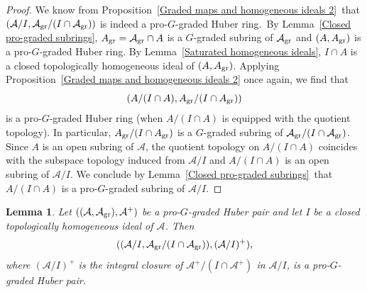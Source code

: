 \documentclass[12pt,twoside,a4paper]{article}
\newtheorem{lemma}[thm]{Lemma}
\theoremstyle{definition}
\theoremstyle{remark}
\newcommand\gr{{\rm gr}}
\begin{document}
\begin{proof}We know from Proposition~\ref{Graded maps and homogeneous ideals 2} that $(\mathcal{A}/I, \mathcal{A}_{\gr}/(I\cap \mathcal{A}_{\gr}))$ is indeed a pro-$G$-graded Huber ring. By Lemma~\ref{Closed pro-graded subrings}, $A_{\gr}=\mathcal{A}_{\gr}\cap A$ is a $G$-graded subring of $\mathcal{A}_{\gr}$ and $(A, A_{\gr})$ is a pro-$G$-graded Huber ring. By Lemma~\ref{Saturated homogeneous ideals}, $I\cap A$ is a closed topologically homogeneous ideal of $(A, A_{\gr})$. Applying Proposition~\ref{Graded maps and homogeneous ideals 2} once again, we find that \begin{equation*}(A/(I\cap A), A_{\gr}/(I\cap A_{\gr}))\end{equation*}is a pro-$G$-graded Huber ring (when $A/(I\cap A)$ is equipped with the quotient topology). In particular, $A_{\gr}/(I\cap A_{\gr})$ is a $G$-graded subring of $\mathcal{A}_{\gr}/(I\cap \mathcal{A}_{\gr})$. Since $A$ is an open subring of $\mathcal{A}$, the quotient topology on $A/(I\cap A)$ coincides with the subspace topology induced from $\mathcal{A}/I$ and $A/(I\cap A)$ is an open subring of $\mathcal{A}/I$. We conclude by Lemma~\ref{Closed pro-graded subrings} that $A/(I\cap A)$ is a pro-$G$-graded subring of $\mathcal{A}/I$.  \end{proof}
\begin{lemma}\label{Quotients of pro-graded Huber pairs}Let $((\mathcal{A}, \mathcal{A}_{\gr}), \mathcal{A}^{+})$ be a pro-$G$-graded Huber pair and let $I$ be a closed topologically homogeneous ideal of $\mathcal{A}$. Then \begin{equation*}((\mathcal{A}/I, \mathcal{A}_{\gr}/(I\cap \mathcal{A}_{\gr})), (\mathcal{A}/I)^{+}),\end{equation*}where $(\mathcal{A}/I)^{+}$ is the integral closure of $\mathcal{A}^{+}/(I\cap \mathcal{A}^{+})$ in $\mathcal{A}/I$, is a pro-$G$-graded Huber pair.\end{lemma}
\end{document}
